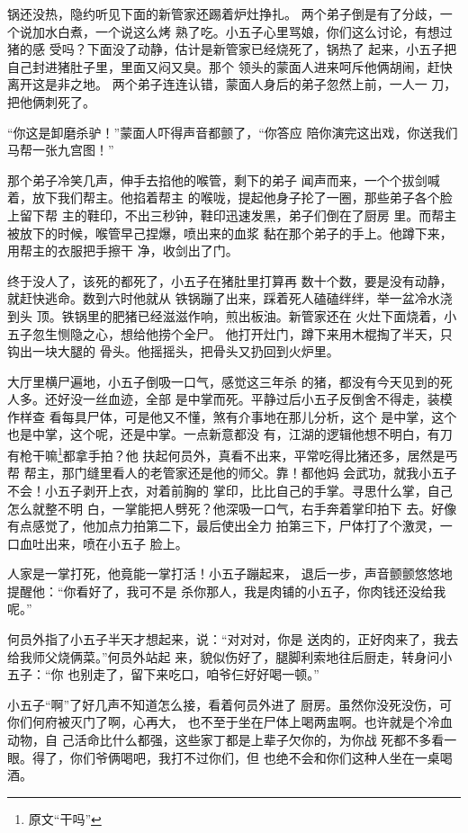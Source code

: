 锅还没热，隐约听见下面的新管家还踢着炉灶挣扎。
两个弟子倒是有了分歧，一个说加水白煮，一个说这么烤
熟了吃。小五子心里骂娘，你们这么讨论，有想过猪的感
受吗？下面没了动静，估计是新管家已经烧死了，锅热了
起来，小五子把自己封进猪肚子里，里面又闷又臭。那个
领头的蒙面人进来呵斥他俩胡闹，赶快离开这是非之地。
两个弟子连连认错，蒙面人身后的弟子忽然上前，一人一
刀，把他俩刺死了。

“你这是卸磨杀驴！”蒙面人吓得声音都颤了，“你答应
陪你演完这出戏，你送我们马帮一张九宫图！”

那个弟子冷笑几声，伸手去掐他的喉管，剩下的弟子
闻声而来，一个个拔剑喊着，放下我们帮主。他掐着帮主
的喉咙，提起他身子抡了一圈，那些弟子各个脸上留下帮
主的鞋印，不出三秒钟，鞋印迅速发黑，弟子们倒在了厨房
里。而帮主被放下的时候，喉管早己捏爆，喷出来的血浆
黏在那个弟子的手上。他蹲下来，用帮主的衣服把手擦干
净，收剑出了门。

终于没人了，该死的都死了，小五子在猪肚里打算再
数十个数，要是没有动静，就赶快逃命。数到六时他就从
铁锅蹦了出来，踩着死人磕磕绊绊，举一盆冷水浇到头
顶。铁锅里的肥猪已经滋滋作响，煎出板油。新管家还在
火灶下面烧着，小五子忽生恻隐之心，想给他捞个全尸。
他打开灶门，蹲下来用木棍掏了半天，只钩出一块大腿的
骨头。他摇摇头，把骨头又扔回到火炉里。

大厅里横尸遍地，小五子倒吸一口气，感觉这三年杀
的猪，都没有今天见到的死人多。还好没一丝血迹，全部
是中掌而死。平静过后小五子反倒舍不得走，装模作样查
看每具尸体，可是他又不懂，煞有介事地在那儿分析，这个
是中掌，这个也是中掌，这个呢，还是中掌。一点新意都没
有，江湖的逻辑他想不明白，有刀有枪干嘛\footnote{原文“干吗”}都拿手拍？他
扶起何员外，真看不出来，平常吃得比猪还多，居然是丐帮
帮主，那门缝里看人的老管家还是他的师父。靠！都他妈
会武功，就我小五子不会！小五子剥开上衣，对着前胸的
掌印，比比自己的手掌。寻思什么掌，自己怎么就整不明
白，一掌能把人劈死？他深吸一口气，右手奔着掌印拍下
去。好像有点感觉了，他加点力拍第二下，最后使出全力
拍第三下，尸体打了个激灵，一口血吐出来，喷在小五子
脸上。

人家是一掌打死，他竟能一掌打活！小五子蹦起来，
退后一步，声音颤颤悠悠地提醒他：“你看好了，我可不是
杀你那人，我是肉铺的小五子，你肉钱还没给我呢。”

何员外指了小五子半天才想起来，说：“对对对，你是
送肉的，正好肉来了，我去给我师父烧俩菜。”何员外站起
来，貌似伤好了，腿脚利索地往后厨走，转身问小五子：“你
也别走了，留下来吃口，咱爷仨好好喝一顿。”

小五子“啊”了好几声不知道怎么接，看着何员外进了
厨房。虽然你没死没伤，可你们何府被灭门了啊，心再大，
也不至于坐在尸体上喝两盅啊。也许就是个冷血动物，自
己活命比什么都强，这些家丁都是上辈子欠你的，为你战
死都不多看一眼。得了，你们爷俩喝吧，我打不过你们，但
也绝不会和你们这种人坐在一桌喝酒。

